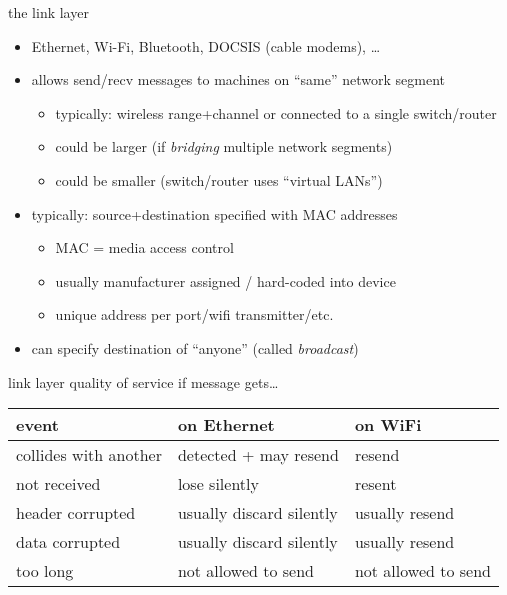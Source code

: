 \begin{frame}{the link layer}
\begin{itemize}
\item Ethernet, Wi-Fi, Bluetooth, DOCSIS (cable modems), \ldots
\vspace{.5cm}
\item allows send/recv messages to machines on ``same'' network segment
    \begin{itemize}
    \item typically: wireless range+channel or connected to a single switch/router
    \item could be larger (if \textit{bridging} multiple network segments)
    \item could be smaller (switch/router uses ``virtual LANs'')
    \end{itemize}
\item typically: source+destination specified with MAC addresses
    \begin{itemize}
    \item MAC = media access control
    \item usually manufacturer assigned / hard-coded into device
    \item unique address per port/wifi transmitter/etc.
    \end{itemize}
\item can specify destination of ``anyone'' (called \textit{broadcast})
\end{itemize}
\end{frame}

\begin{frame}{link layer quality of service}
if message gets\ldots \\
\small
\begin{tabular}{l|l|l}
event & on Ethernet & on WiFi \\\hline
collides with another & detected + may resend & resend\\
not received & lose silently & resent \\
header corrupted & usually discard silently & usually resend \\
data corrupted & usually discard silently & usually resend \\
too long & not allowed to send & not allowed to send \\
\end{tabular}
\end{frame}
